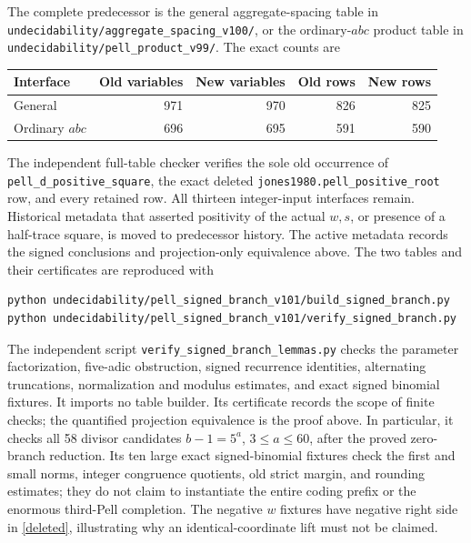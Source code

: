 \documentclass[11pt]{article}
\begin{document}
The complete predecessor is the general aggregate-spacing table in
\nolinkurl{undecidability/aggregate_spacing_v100/}, or the ordinary-\(abc\)
product table in \nolinkurl{undecidability/pell_product_v99/}.
The exact counts are
\begin{center}
\begin{tabular}{lrrrr}
\toprule
Interface & Old variables & New variables & Old rows & New rows\\
\midrule
General & 971 & 970 & 826 & 825\\
Ordinary \(abc\) & 696 & 695 & 591 & 590\\
\bottomrule
\end{tabular}
\end{center}
The independent full-table checker verifies the sole old occurrence of
\texttt{pell\_d\_positive\_square}, the exact deleted
\texttt{jones1980.pell\_positive\_root} row, and every retained row.
All thirteen integer-input interfaces remain. Historical metadata that
asserted positivity of the actual \(w,s\), or presence of a half-trace
square, is moved to predecessor history. The active metadata records
the signed conclusions and projection-only equivalence above.
The two tables and their certificates are reproduced with
\begin{verbatim}
python undecidability/pell_signed_branch_v101/build_signed_branch.py
python undecidability/pell_signed_branch_v101/verify_signed_branch.py
\end{verbatim}

The independent script \texttt{verify\_signed\_branch\_lemmas.py}
checks the parameter factorization, five-adic obstruction, signed
recurrence identities, alternating truncations, normalization and
modulus estimates, and exact signed binomial fixtures. It imports
no table builder. Its certificate records the scope of finite checks;
the quantified projection equivalence is the proof above.
In particular, it checks all 58 divisor candidates
\(b-1=5^a\), \(3\le a\le60\), after the proved zero-branch
reduction. Its ten large exact signed-binomial fixtures check the
first and small norms, integer congruence quotients, old strict margin,
and rounding estimates; they do not claim to instantiate the entire
coding prefix or the enormous third-Pell completion. The negative
\(w\) fixtures have negative right side in \eqref{deleted}, illustrating
why an identical-coordinate lift must not be claimed.
\end{document}
